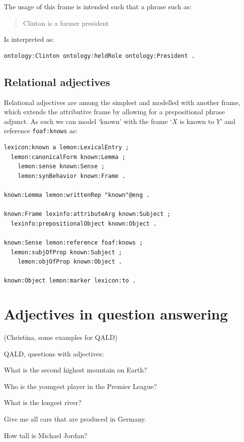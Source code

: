 \documentclass[11pt]{article}
\begin{document}
The usage of this frame is intended such that a phrase such as:

\begin{quote}
Clinton is a former president
\end{quote}

Is interpreted as:

\begin{verbatim}
ontology:Clinton ontology:heldRole ontology:President .
\end{verbatim}

\subsection{Relational adjectives}

Relational adjectives are among the simplest and modelled with another frame,
which extends the attributive frame by allowing for a prepositional phrase
adjunct. As such we can model `known' with the frame `$X$ is known to $Y$' and
reference {\tt foaf:knows} as:

\begin{verbatim}
lexicon:known a lemon:LexicalEntry ;
  lemon:canonicalForm known:Lemma ;
	lemon:sense known:Sense ;
	lemon:synBehavior known:Frame .

known:Lemma lemon:writtenRep "known"@eng .

known:Frame lexinfo:attributeArg known:Subject ;
  lexinfo:prepositionalObject known:Object .

known:Sense lemon:reference foaf:knows ;
  lemon:subjOfProp known:Subject ;
	lemon:objOfProp known:Object .
	
known:Object lemon:marker lexicon:to .
\end{verbatim}

\section{Adjectives in question answering}

(Christina, some examples for QALD)

QALD, questions with adjectives:

What is the second highest mountain on Earth?

Who is the youngest player in the Premier League?

What is the longest river?

Give me all cars that are produced in Germany.

How tall is Michael Jordan?
\end{document}
